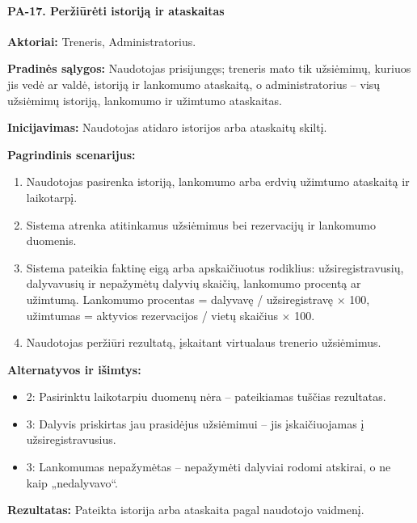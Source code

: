 \paragraph{PA-17. Peržiūrėti istoriją ir ataskaitas}\mbox{}\par
\textbf{Aktoriai:} Treneris, Administratorius.\par
\textbf{Pradinės sąlygos:} Naudotojas prisijungęs; treneris mato tik užsiėmimų, kuriuos jis vedė ar valdė, istoriją ir lankomumo ataskaitą, o administratorius -- visų užsiėmimų istoriją, lankomumo ir užimtumo ataskaitas.\par
\textbf{Inicijavimas:} Naudotojas atidaro istorijos arba ataskaitų skiltį.\par
\textbf{Pagrindinis scenarijus:}
\begin{enumerate}
\item Naudotojas pasirenka istoriją, lankomumo arba erdvių užimtumo ataskaitą ir laikotarpį.
\item Sistema atrenka atitinkamus užsiėmimus bei rezervacijų ir lankomumo duomenis.
\item Sistema pateikia faktinę eigą arba apskaičiuotus rodiklius: užsiregistravusių, dalyvavusių ir nepažymėtų dalyvių skaičių, lankomumo procentą ar užimtumą. Lankomumo procentas = dalyvavę / užsiregistravę $\times$ 100, užimtumas = aktyvios rezervacijos / vietų skaičius $\times$ 100.
\item Naudotojas peržiūri rezultatą, įskaitant virtualaus trenerio užsiėmimus.
\end{enumerate}
\textbf{Alternatyvos ir išimtys:}
\begin{itemize}
\item 2: Pasirinktu laikotarpiu duomenų nėra -- pateikiamas tuščias rezultatas.
\item 3: Dalyvis priskirtas jau prasidėjus užsiėmimui -- jis įskaičiuojamas į užsiregistravusius.
\item 3: Lankomumas nepažymėtas -- nepažymėti dalyviai rodomi atskirai, o ne kaip „nedalyvavo“.
\end{itemize}
\textbf{Rezultatas:} Pateikta istorija arba ataskaita pagal naudotojo vaidmenį.\par
{}
